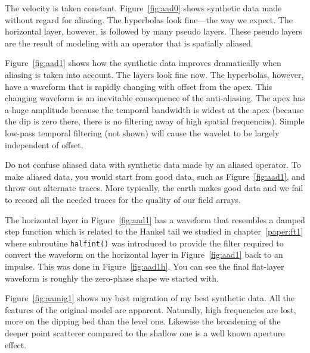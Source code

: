 The velocity is taken constant.
Figure~\ref{fig:aad0} shows synthetic data made without regard for aliasing.
The hyperbolas look fine---the way we expect.
The horizontal layer, however, is followed by many pseudo layers.
These pseudo layers are the result of modeling with an operator
that is spatially aliased.

Figure~\ref{fig:aad1} shows how the synthetic data improves dramatically
when aliasing is taken into account.
The layers look fine now.
The hyperbolas, however,
have a waveform that is rapidly changing
with offset from the apex.
This changing waveform is an inevitable consequence of the anti-aliasing.
The apex has a huge amplitude
because the temporal bandwidth is widest at the apex
(because the dip is zero there,
there is no filtering away of high spatial frequencies).
Simple low-pass temporal filtering (not shown)
will cause the wavelet to be largely independent of offset.

\par
Do not confuse aliased data with synthetic data made by an aliased operator.
To make aliased data, you would start from good data,
such as Figure~\ref{fig:aad1},
and throw out alternate traces.
More typically, the earth makes good data and we fail to record
all the needed traces for the quality of our field arrays.

\par
The horizontal layer in Figure~\ref{fig:aad1}
has a waveform that resembles a damped step function
which is related to the Hankel tail we studied in chapter~\ref{paper:ft1}
where subroutine \texttt{halfint()}  was introduced
to provide the filter required to convert
the waveform on the  horizontal layer in Figure~\ref{fig:aad1} back to an impulse.
This was done in Figure~\ref{fig:aad1h}.
You can see the final flat-layer waveform
is roughly the zero-phase shape we started with.

Figure~\ref{fig:aamig1} shows my best migration of my best synthetic data.
All the features of the original model are apparent.
Naturally, high frequencies are lost,
more on the dipping bed than the level one.  
Likewise the broadening of the deeper point scatterer compared
to the shallow one is a well known aperture effect.

